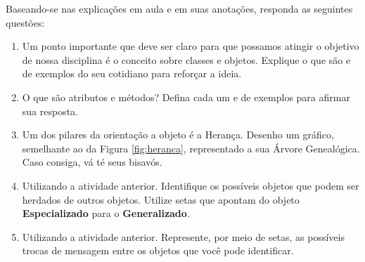  Baseando-se nas explicações em aula e em suas anotações, responda as seguintes questões:

  \begin{enumerate}
  	\item   Um ponto importante que deve ser claro para que possamos atingir o objetivo de nossa disciplina é o conceito sobre classes e objetos. Explique o que são e de exemplos do seu cotidiano para reforçar a ideia.
  	\item O que são atributos e métodos? Defina cada um e de exemplos para afirmar sua resposta.
  	\item Um dos pilares da orientação a objeto é a Herança. Desenho um gráfico, semelhante ao da Figura \ref{fig:heranca}, representado a sua Árvore Genealógica. Caso consiga, vá té seus bisavós. 
  	\item Utilizando a atividade anterior. Identifique os possíveis objetos que podem ser herdados de outros objetos. Utilize setas que apontam do objeto \textbf{Especializado} para o \textbf{Generalizado}. 
  	\item Utilizando a atividade anterior. Represente, por meio de setas, as possíveis trocas de mensagem entre os objetos que você pode identificar. 
  \end{enumerate}
  



  

  



